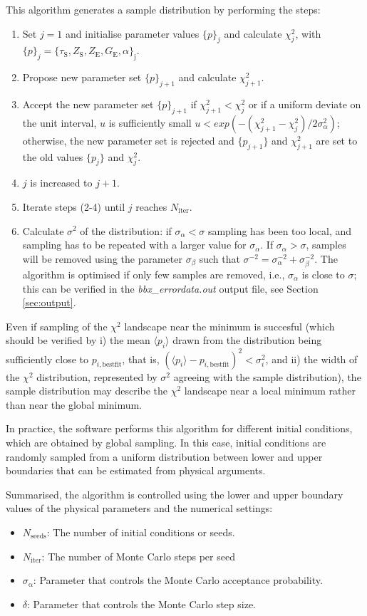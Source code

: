 \documentclass[  superscriptaddress]{revtex4}
\begin{document}
This algorithm generates a sample distribution by performing the steps: 
\begin{enumerate}
\item Set $j=1$ and initialise parameter values $\{p\}_j$ and calculate $\chi^2_j$, with $\{p\}_j= \{\tau_{\mathrm{S}},Z_{\mathrm{S}},Z_{\mathrm{E}},G_{\mathrm{E}},\alpha\}_\mathrm{j}$.
\item Propose new parameter set $\{p\}_{j+1}$ and calculate  $\chi^2_{j+1}$. 
\item Accept the new parameter set $\{p\}_{j+1}$ if $\chi^2_{j+1}<\chi^2_{j}$ or if a uniform deviate on the unit interval, $u$ is sufficiently small $u<exp(-(\chi^2_{j+1}-\chi^2_{j})/2\sigma_\alpha^2)$; otherwise, the new parameter set is rejected and $\{p_{j+1}\}$ and $\chi^2_{j+1}$ are set to the old values $\{p_{j}\}$ and $\chi^2_{j}$.
\item $j$ is increased to $j+1$. 
\item Iterate steps (2-4) until $j$ reaches $N_\mathrm{iter}$.
\item Calculate $\sigma^2$ of the distribution: if $\sigma_\alpha < \sigma$ sampling has been too local, and sampling has to be repeated with a larger value for $\sigma_\alpha$. If $\sigma_\alpha>\sigma$, samples will be removed using the parameter $\sigma_\beta$ such that $\sigma^{-2}=\sigma_\alpha^{-2}+\sigma_\beta^{-2}$. The algorithm is optimised if only few samples are removed, i.e., $\sigma_\alpha$ is close to $\sigma$; this can be verified in the \emph{bbx\_errordata.out} output file, see Section \ref{sec:output}. 
\end{enumerate}


Even if sampling of the $\chi^2$ landscape near the minimum is succesful (which should be verified by i) the mean $\langle p_{i}\rangle$ drawn from the distribution being sufficiently close to $p_{i,\mathrm{best fit}}$, that is, $(\langle p_{i}\rangle - p_{i,\mathrm{best fit}})^2 < \sigma_i^2$, and ii) the width of the $\chi^2$ distribution, represented by $\sigma^2$ agreeing with the sample distribution), the sample distribution may describe the $\chi^2$ landscape near a local minimum rather than near the global minimum.

In practice, the software performs this algorithm for different initial conditions, which are obtained by global sampling. 
In this case, initial conditions are randomly sampled from a uniform distribution between lower and upper boundaries that can be estimated from physical arguments.

Summarised, the algorithm is controlled using the lower and upper boundary values of the physical parameters and the numerical settings:
\begin{itemize}
 \item $N_\mathrm{seeds}$: The number of initial conditions or seeds.
 \item $N_\mathrm{iter}$:  The number of Monte Carlo steps per seed
 \item $\sigma_\mathrm{\alpha}$: Parameter that controls the Monte Carlo acceptance probability.
 \item $\delta$: Parameter that controls the Monte Carlo step size.
\end{itemize} 
\end{document}
